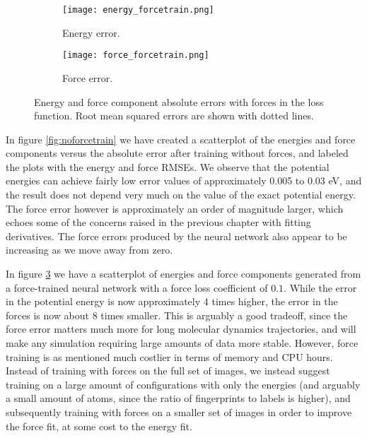\begin{figure}[H]
\begin{adjustbox}{max width=1.2\linewidth,center}
\centering
  \begin{subfigure}[b]{0.55\textwidth}
      \texttt{[image: energy\_forcetrain.png]}
      \caption{Energy error.}
    \label{fig:f1}
  \end{subfigure}
  \hfill
  \begin{subfigure}[b]{0.55\textwidth}
      \texttt{[image: force\_forcetrain.png]}
      \caption{Force error.}
    \label{fig:f2}
  \end{subfigure}
\end{adjustbox}
\caption{Energy and force component absolute errors with forces in the
    loss function. Root mean squared errors are shown with dotted lines.}
    \label{fig:forcetrain}
\end{figure}

In figure \ref{fig:noforcetrain} we have created a scatterplot
of the energies and force components versus 
the absolute error after training without
forces, and labeled the plots with the energy and force RMSEs.
We observe that the potential energies can achieve fairly
low error values of approximately 0.005 to 0.03 eV, and the
result does not depend very much on the value of the exact potential
energy.
The force error however is approximately an order of magnitude
larger, which echoes some of the concerns raised in the previous
chapter with fitting derivatives. The force errors produced by the neural
network also appear to be increasing as we move away from zero.
\par
In figure \ref{fig:forcetrain} we have a scatterplot of energies
and force components generated from a force-trained neural network
with a force loss coefficient of $0.1$.
While the error in the potential energy is now approximately 4 times higher,
the error in the forces is now about 8 times smaller.
This is arguably a good tradeoff, since the force error matters
much more for long molecular dynamics trajectories, and will make
any simulation requiring large amounts of data more stable.
However, force training is as mentioned much costlier in terms
of memory and CPU hours. Instead of training with forces on the full
set of images, we instead suggest training on a large amount of configurations
with only the energies (and arguably a small amount of atoms, since
the ratio of fingerprints to labels is higher), and subsequently training
with forces on a smaller set of images in order to improve the force fit,
at some cost to the energy fit.

